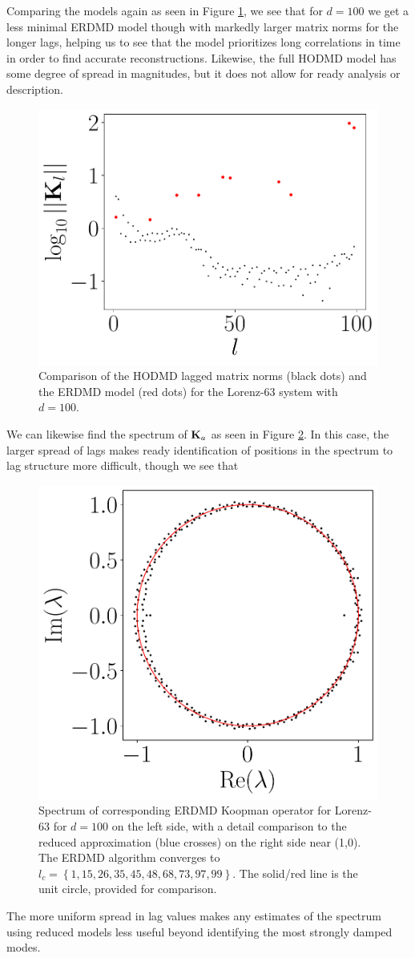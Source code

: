 \documentclass[a4paper,11pt]{article}
\begin{document}
Comparing the models again as seen in Figure \ref{fig:model_comp_d_99}, we see that for $d=100$ we get a less minimal ERDMD model though with markedly larger matrix norms for the longer lags, helping us to see that the model prioritizes long correlations in time in order to find accurate reconstructions.  Likewise, the full HODMD model has some degree of spread in magnitudes, but it does not allow for ready analysis or description.    
\begin{figure}[!h]
\centering
\includegraphics[width=.7\textwidth]{Lorenz_norm_full_model_99}
\caption{Comparison of the HODMD lagged matrix norms (black dots) and the ERDMD model (red dots) for the Lorenz-63 system with $d=100$.}
\label{fig:model_comp_d_99}
\end{figure}
 
We can likewise find the spectrum of ${\bf K}_{a}$ as seen in Figure \ref{fig:lorenz_spectrum_d_100}.  In this case, the larger spread of lags makes ready identification of positions in the spectrum to lag structure more difficult, though we see that 
\begin{figure}[!h]
\centering
\includegraphics[width=.5\textwidth]{Lorenz_spectrum_w_mx_lag_99}
\caption{Spectrum of corresponding ERDMD Koopman operator for Lorenz-63 for $d=100$ on the left side, with a detail comparison to the reduced approximation (blue crosses) on the right side near (1,0).  The ERDMD algorithm converges to $l_{c}=\left\{1,15, 26, 35, 45, 48, 68, 73, 97,99\right\}$.  The solid/red line is the unit circle, provided for comparison.}
\label{fig:lorenz_spectrum_d_100}
\end{figure}
The more uniform spread in lag values makes any estimates of the spectrum using reduced models less useful beyond identifying the most strongly damped modes.  
\end{document}
